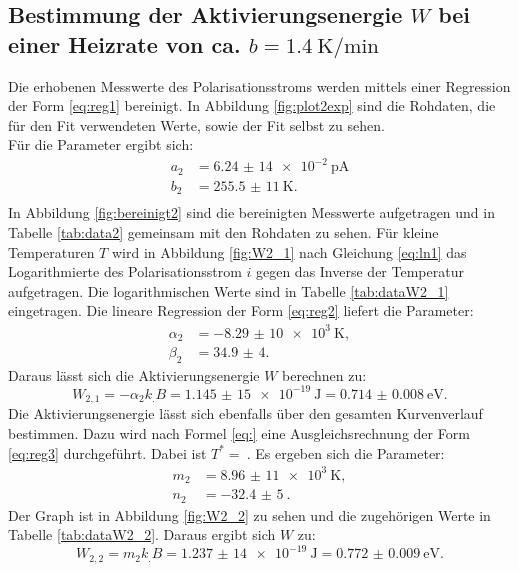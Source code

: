 \subsection{Bestimmung der Aktivierungsenergie $W$ bei einer Heizrate von ca. $b=\SI{1,4}{\kelvin\per\minute}$}

Die erhobenen Messwerte des Polarisationsstroms werden mittels einer Regression der Form \eqref{eq:reg1} bereinigt. In Abbildung \ref{fig:plot2exp} sind die Rohdaten, die für den Fit verwendeten Werte, sowie der Fit selbst zu sehen.\\
Für die Parameter ergibt sich:
\begin{align*}
a_2&=\SI{6,24(14)e-2}{\pico\ampere}\\
b_2&=\SI{255,5(11)}{\kelvin}\text{.}\\
\end{align*}
In Abbildung \ref{fig:bereinigt2} sind die bereinigten Messwerte aufgetragen und in Tabelle \ref{tab:data2} gemeinsam mit den Rohdaten zu sehen.
Für kleine Temperaturen $T$ wird in Abbildung \ref{fig:W2_1} nach Gleichung \eqref{eq:ln1} das Logarithmierte des Polarisationsstrom $i$ gegen das Inverse der Temperatur aufgetragen. Die logarithmischen Werte sind in Tabelle \ref{tab:dataW2_1} eingetragen.
Die lineare Regression der Form \eqref{eq:reg2} liefert die Parameter:
\begin{align*}
\alpha_2&=\SI{-8,29(10)e3}{\kelvin},\\
\beta_2 &= \num{34,9(4)}\text{.}
\end{align*}
Daraus lässt sich die Aktivierungsenergie $W$ berechnen zu:
\[
W_{2,1} = -\alpha_2 k_.B =\SI{1,145(15)e-19}{\joule}=\SI{0.714(8)}{\electronvolt}\text{.}
\]
Die Aktivierungsenergie lässt sich ebenfalls über den gesamten Kurvenverlauf bestimmen. Dazu wird nach Formel \eqref{eq:} eine Ausgleichsrechnung der Form \eqref{eq:reg3} durchgeführt. Dabei ist $T^*=\SI{}{}$. Es ergeben sich die Parameter:
\begin{align*}
m_2&=\SI{8,96(11)e3}{\kelvin},\\
n_2&=\SI{-32,4(5)}{}\text{.}
\end{align*}
Der Graph ist in Abbildung \ref{fig:W2_2} zu sehen und die zugehörigen Werte in Tabelle \ref{tab:dataW2_2}.
Daraus ergibt sich $W$ zu:
\[
W_{2,2} = m_2 k_.B =\SI{1,237(14)e-19}{\joule}=\SI{0.772(9)}{\electronvolt}\text{.}
\]

